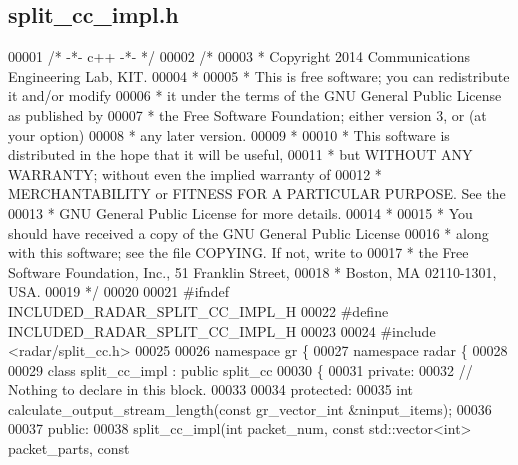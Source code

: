 \subsection{split\+\_\+cc\+\_\+impl.\+h}
\label{split__cc__impl_8h_source}

\begin{DoxyCode}
00001 \textcolor{comment}{/* -*- c++ -*- */}
00002 \textcolor{comment}{/* }
00003 \textcolor{comment}{ * Copyright 2014 Communications Engineering Lab, KIT.}
00004 \textcolor{comment}{ * }
00005 \textcolor{comment}{ * This is free software; you can redistribute it and/or modify}
00006 \textcolor{comment}{ * it under the terms of the GNU General Public License as published by}
00007 \textcolor{comment}{ * the Free Software Foundation; either version 3, or (at your option)}
00008 \textcolor{comment}{ * any later version.}
00009 \textcolor{comment}{ * }
00010 \textcolor{comment}{ * This software is distributed in the hope that it will be useful,}
00011 \textcolor{comment}{ * but WITHOUT ANY WARRANTY; without even the implied warranty of}
00012 \textcolor{comment}{ * MERCHANTABILITY or FITNESS FOR A PARTICULAR PURPOSE.  See the}
00013 \textcolor{comment}{ * GNU General Public License for more details.}
00014 \textcolor{comment}{ * }
00015 \textcolor{comment}{ * You should have received a copy of the GNU General Public License}
00016 \textcolor{comment}{ * along with this software; see the file COPYING.  If not, write to}
00017 \textcolor{comment}{ * the Free Software Foundation, Inc., 51 Franklin Street,}
00018 \textcolor{comment}{ * Boston, MA 02110-1301, USA.}
00019 \textcolor{comment}{ */}
00020  
00021 \textcolor{preprocessor}{#ifndef INCLUDED\_RADAR\_SPLIT\_CC\_IMPL\_H}
00022 \textcolor{preprocessor}{#define INCLUDED\_RADAR\_SPLIT\_CC\_IMPL\_H}
00023 
00024 \textcolor{preprocessor}{#include <radar/split_cc.h>}
00025 
00026 \textcolor{keyword}{namespace }gr \{
00027   \textcolor{keyword}{namespace }radar \{
00028 
00029     \textcolor{keyword}{class }split_cc_impl : \textcolor{keyword}{public} split_cc
00030     \{
00031      \textcolor{keyword}{private}:
00032       \textcolor{comment}{// Nothing to declare in this block.}
00033 
00034      \textcolor{keyword}{protected}:
00035       \textcolor{keywordtype}{int} calculate_output_stream_length(\textcolor{keyword}{const} gr\_vector\_int &ninput\_items);
00036 
00037      \textcolor{keyword}{public}:
00038       split_cc_impl(\textcolor{keywordtype}{int} packet\_num, \textcolor{keyword}{const} std::vector<int> packet\_parts, \textcolor{keyword}{const} 

\end{DoxyCode}
